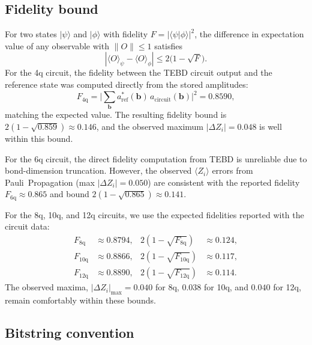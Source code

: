 \documentclass[11pt]{article}
\begin{document}
\subsection{Fidelity bound}

For two states $|\psi\rangle$ and $|\phi\rangle$ with fidelity $F = |\langle \psi | \phi \rangle|^2$, the difference in expectation value of any observable with $\|O\| \leq 1$ satisfies
\begin{equation}
  |\langle O \rangle_\psi - \langle O \rangle_\phi| \leq 2\bigl(1 - \sqrt{F}\bigr).
\end{equation}
For the 4q circuit, the fidelity between the TEBD circuit output and the reference state was computed directly from the stored amplitudes:
\begin{equation}
  F_{4\mathrm{q}} = \bigl|\textstyle\sum_{\mathbf{b}} a_{\mathrm{ref}}^*(\mathbf{b})\, a_{\mathrm{circuit}}(\mathbf{b})\bigr|^2 = 0.8590,
\end{equation}
matching the expected value.
The resulting fidelity bound is $2(1-\sqrt{0.859}) \approx 0.146$, and the observed maximum $|\Delta Z_i| = 0.048$ is well within this bound.

For the 6q circuit, the direct fidelity computation from TEBD is unreliable due to bond-dimension truncation.
However, the observed $\langle Z_i \rangle$ errors from Pauli~Propagation (max $|\Delta Z_i| = 0.050$) are consistent with the reported fidelity $F_{6\mathrm{q}} \approx 0.865$ and bound $2(1-\sqrt{0.865}) \approx 0.141$.

For the 8q, 10q, and 12q circuits, we use the expected fidelities reported with the circuit data:
\begin{align}
  F_{8\mathrm{q}} &\approx 0.8794, & 2(1-\sqrt{F_{8\mathrm{q}}}) &\approx 0.124, \\
  F_{10\mathrm{q}} &\approx 0.8866, & 2(1-\sqrt{F_{10\mathrm{q}}}) &\approx 0.117, \\
  F_{12\mathrm{q}} &\approx 0.8890, & 2(1-\sqrt{F_{12\mathrm{q}}}) &\approx 0.114.
\end{align}
The observed maxima, $|\Delta Z_i|_{\max} = 0.040$ for 8q, $0.038$ for 10q, and $0.040$ for 12q, remain comfortably within these bounds.

\subsection{Bitstring convention}
\end{document}
